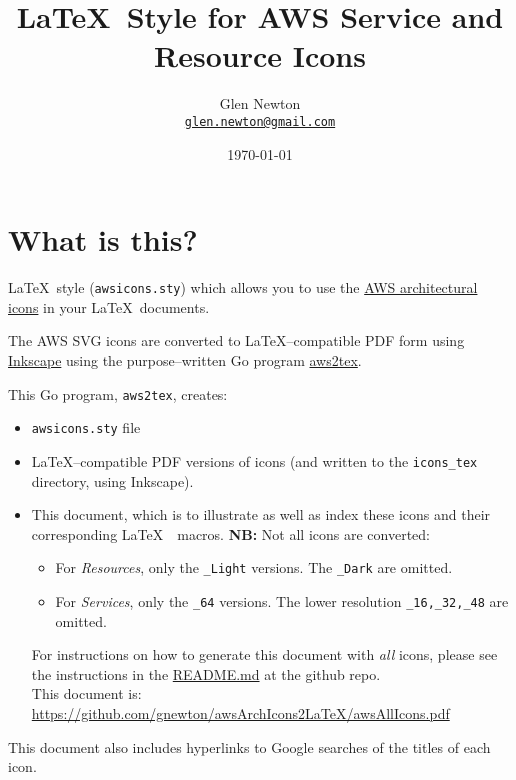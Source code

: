 \documentclass[12pt]{article}
\title{\LaTeX\ Style for AWS Service and Resource Icons}
\author{Glen Newton \\\texttt{\href{mailto:glen.newton@gmail.com}{glen.newton@gmail.com}}}
\date{\today}
\begin{document}
\maketitle
\tableofcontents\label{toc}
\noindent\makebox[\linewidth]{\rule{\paperwidth}{0.4pt}}

\section{What is this?}
\LaTeX\ style (\texttt{awsicons.sty}) which allows you to use the \href{https://aws.amazon.com/architecture/icons/}{AWS architectural icons} in your \LaTeX\  documents.

\vspace{3mm}

\noindent The AWS SVG icons are converted to {\LaTeX}--compatible PDF form using \href{https://inkscape.org/}{Inkscape} \texttt{\inkscapeVersion} using the purpose--written Go program \href{https://github.com/gnewton/awsArchIcons2LaTeX/aws2tex}{aws2tex}. 

\noindent This Go program, \texttt{aws2tex}, creates:
\begin{itemize}
\item \texttt{awsicons.sty} file
\item \LaTeX--compatible PDF versions of icons (and written to the \texttt{icons\_tex} directory, using Inkscape).
\item This document, which is to illustrate as well as index these icons and their corresponding \LaTeX\ \  macros.
  \newline
  \textbf{NB:} Not all icons are converted:
  \begin{itemize}
  \item For \textit{Resources}, only the \texttt{\_Light} versions. The \texttt{\_Dark} are omitted.
  \item For \textit{Services}, only the \texttt{\_64} versions. The lower resolution \texttt{\_16,\_32,\_48} are omitted.
  \end{itemize}
For instructions on how to generate this document with \textit{all} icons, please see the instructions in the \href{https://github.com/gnewton/awsArchIcons2LaTeX}{README.md} at the github repo.\\
This document is: \url{https://github.com/gnewton/awsArchIcons2LaTeX/awsAllIcons.pdf}
\end{itemize}
This document also includes hyperlinks to Google searches of the titles of each icon.
\end{document}
